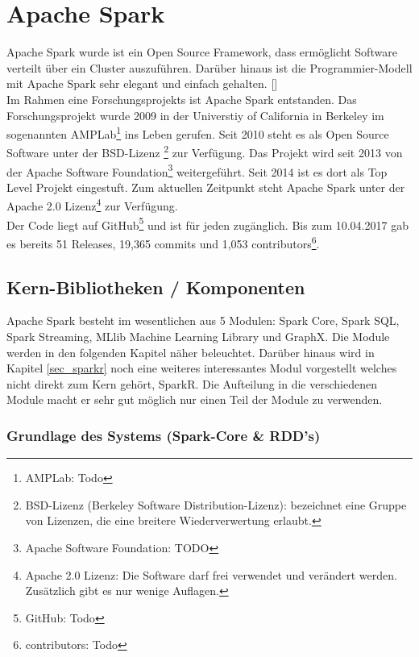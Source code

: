 \newpage
\chapter{Apache Spark} 

Apache Spark wurde ist ein Open Source Framework, dass ermöglicht Software verteilt \"uber ein Cluster auszuführen. Dar\"uber hinaus ist die Programmier-Modell mit Apache Spark sehr elegant und einfach gehalten. [\cite{AAWS15}] \\
Im Rahmen eine Forschungsprojekts ist Apache Spark entstanden. Das Forschungsprojekt wurde 2009 in der Universtiy of California in Berkeley im sogenannten AMPLab\footnote{AMPLab: Todo} ins Leben gerufen. Seit 2010 steht es als Open Source Software unter der BSD-Lizenz \footnote{BSD-Lizenz (Berkeley Software Distribution-Lizenz): bezeichnet eine Gruppe von Lizenzen, die eine breitere Wiederverwertung erlaubt.} zur Verfügung. Das Projekt wird seit 2013 von der Apache Software Foundation\footnote{Apache Software Foundation: TODO} weitergef\"uhrt. Seit 2014 ist es dort als Top Level Projekt eingestuft. Zum aktuellen Zeitpunkt steht Apache Spark unter der Apache 2.0 Lizenz\footnote{ Apache 2.0 Lizenz: Die Software darf frei verwendet und ver\"andert werden. Zus\"atzlich gibt es nur wenige Auflagen.} zur Verf\"ugung. \\
Der Code liegt auf GitHub\footnote{GitHub: Todo } und ist f\"ur jeden zug\"anglich. Bis zum 10.04.2017 gab es bereits 51 Releases, 19,365 commits und 1,053 contributors\footnote{contributors: Todo }.


\section{Kern-Bibliotheken / Komponenten}

Apache Spark besteht im wesentlichen aus 5 Modulen: Spark Core, Spark SQL, Spark Streaming, MLlib Machine Learning Library und GraphX. 
Die Module werden in den folgenden Kapitel n\"aher beleuchtet. 
Dar\"uber hinaus wird in Kapitel \ref{sec_sparkr} noch eine weiteres interessantes Modul vorgestellt welches nicht direkt zum Kern geh\"ort, SparkR.
Die Aufteilung in die verschiedenen Module macht er sehr gut m\"oglich nur einen Teil der Module zu verwenden. 

\subsection{Grundlage des Systems (Spark-Core \& RDD’s)}\label{sec_sparkcore}

